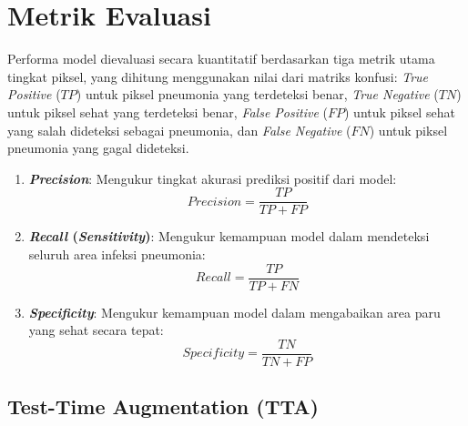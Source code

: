 \documentclass[12pt,a4paper,oneside]{book}
\begin{document}
\section{Metrik Evaluasi}

Performa model dievaluasi secara kuantitatif berdasarkan tiga metrik utama tingkat piksel, yang dihitung menggunakan nilai dari matriks konfusi: \textit{True Positive} ($TP$) untuk piksel pneumonia yang terdeteksi benar, \textit{True Negative} ($TN$) untuk piksel sehat yang terdeteksi benar, \textit{False Positive} ($FP$) untuk piksel sehat yang salah dideteksi sebagai pneumonia, dan \textit{False Negative} ($FN$) untuk piksel pneumonia yang gagal dideteksi.

\begin{enumerate}
  \item \textbf{\textit{Precision}}: Mengukur tingkat akurasi prediksi positif dari model:
  \begin{equation}
    Precision = \frac{TP}{TP + FP}
  \end{equation}
  \item \textbf{\textit{Recall} (\textit{Sensitivity})}: Mengukur kemampuan model dalam mendeteksi seluruh area infeksi pneumonia:
  \begin{equation}
    Recall = \frac{TP}{TP + FN}
  \end{equation}
  \item \textbf{\textit{Specificity}}: Mengukur kemampuan model dalam mengabaikan area paru yang sehat secara tepat:
  \begin{equation}
    Specificity = \frac{TN}{TN + FP}
  \end{equation}
\end{enumerate}

\subsection{Test-Time Augmentation (TTA)}
\end{document}
